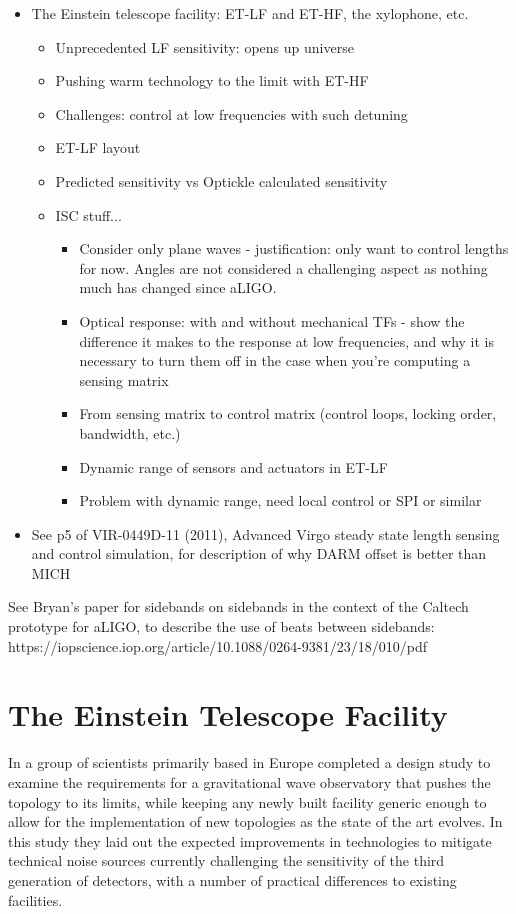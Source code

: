 \begin{itemize}
  \item The Einstein telescope facility: ET-LF and ET-HF, the xylophone, etc.
    \begin{itemize}
      \item Unprecedented LF sensitivity: opens up universe
      \item Pushing warm technology to the limit with ET-HF
      \item Challenges: control at low frequencies with such detuning
      \item ET-LF layout
      \item Predicted sensitivity vs Optickle calculated sensitivity
      \item ISC stuff...
	\begin{itemize}
	  \item Consider only plane waves - justification: only want to control lengths for now. Angles are not considered a challenging aspect as nothing much has changed since aLIGO.
	  \item Optical response: with and without mechanical TFs - show the difference it makes to the response at low frequencies, and why it is necessary to turn them off in the case when you're computing a sensing matrix
	  \item From sensing matrix to control matrix (control loops, locking order, bandwidth, etc.)
	  \item Dynamic range of sensors and actuators in ET-LF
	  \item Problem with dynamic range, need local control or SPI or similar
	\end{itemize}
      \end{itemize}
      
  \item See p5 of VIR-0449D-11 (2011), Advanced Virgo steady state length sensing and control simulation, for description of why DARM offset is better than MICH
\end{itemize}
  
See Bryan's paper for sidebands on sidebands in the context of the Caltech prototype for aLIGO, to describe the use of beats between sidebands: https://iopscience.iop.org/article/10.1088/0264-9381/23/18/010/pdf

\section{The Einstein Telescope Facility}
In  a group of scientists primarily based in Europe completed a design study to examine the requirements for a gravitational wave observatory that pushes the \MI{} topology to its limits, while keeping any newly built facility generic enough to allow for the implementation of new topologies as the state of the art evolves. In this study they laid out the expected improvements in technologies to mitigate technical noise sources currently challenging the sensitivity of the third generation of detectors, with a number of practical differences to existing facilities.

